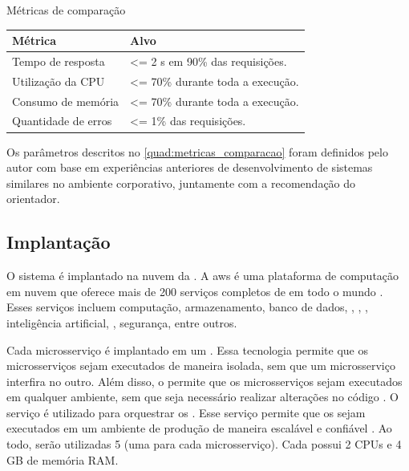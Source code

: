 \begin{quadro}[H]
    \centering
    \caption{Métricas de comparação}
    \label{quad:metricas_comparacao}
    \begin{tabular}{|p{1.2in}|p{3.5in}|}
    \hline
    
    \textbf{Métrica} & \textbf{Alvo} \\ \hline
    Tempo de resposta & <= 2 s em 90\% das requisições. \\ \hline
    Utilização da CPU & <= 70\% durante toda a execução. \\ \hline
    Consumo de memória & <= 70\% durante toda a execução. \\ \hline
    Quantidade de erros & <= 1\% das requisições. \\ \hline

    \end{tabular}
\end{quadro}

Os parâmetros descritos no \autoref{quad:metricas_comparacao} foram definidos pelo autor com base em experiências anteriores de desenvolvimento de sistemas similares no ambiente corporativo, juntamente com a recomendação do orientador.

\subsection{Implantação}
\label{section:implantacao}
O sistema é implantado na nuvem da . A \acrshort{aws} é uma plataforma de computação em nuvem que oferece mais de 200 serviços completos de  em todo o mundo \cite{aws}. Esses serviços incluem computação, armazenamento, banco de dados, , , , inteligência artificial, , segurança, entre outros.

Cada microsserviço é implantado em um  . Essa tecnologia permite que os microsserviços sejam executados de maneira isolada, sem que um microsserviço interfira no outro. Além disso, o  permite que os microsserviços sejam executados em qualquer ambiente, sem que seja necessário realizar alterações no código \cite{docker}. O serviço  é utilizado para orquestrar os  . Esse serviço permite que os  sejam executados em um ambiente de produção de maneira escalável e confiável \cite{amazonEcs}. Ao todo, serão utilizadas 5  (uma para cada microsserviço). Cada  possui 2 CPUs e 4 GB de memória RAM.

